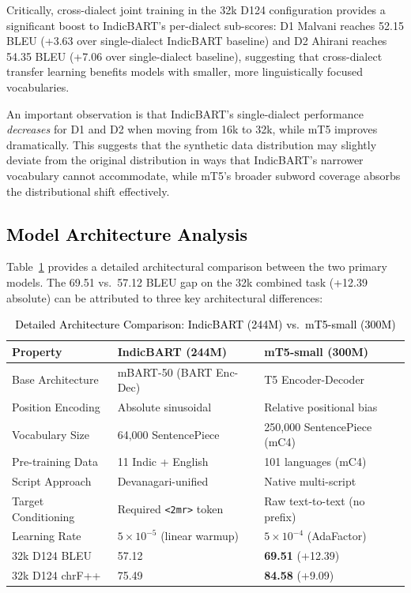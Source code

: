 Critically, cross-dialect joint training in the 32k D124 configuration provides a significant boost to IndicBART's per-dialect sub-scores: D1 Malvani reaches 52.15 BLEU (+3.63 over single-dialect IndicBART baseline) and D2 Ahirani reaches 54.35 BLEU (+7.06 over single-dialect baseline), suggesting that cross-dialect transfer learning benefits models with smaller, more linguistically focused vocabularies.

An important observation is that IndicBART's single-dialect performance \textit{decreases} for D1 and D2 when moving from 16k to 32k, while mT5 improves dramatically. This suggests that the synthetic data distribution may slightly deviate from the original distribution in ways that IndicBART's narrower vocabulary cannot accommodate, while mT5's broader subword coverage absorbs the distributional shift effectively.

\subsection{\textcolor{black}{Model Architecture Analysis}}

Table~\ref{tab:arch_compare} provides a detailed architectural comparison between the two primary models. The 69.51 vs.\ 57.12 BLEU gap on the 32k combined task (+12.39 absolute) can be attributed to three key architectural differences:

\begin{table}[t]
\color{black}
\centering
\caption{\textcolor{black}{Detailed Architecture Comparison: IndicBART (244M) vs.\ mT5-small (300M)}}
\label{tab:arch_compare}
\begin{tabularx}{\textwidth}{lXX}
\hline
\textbf{Property} & \textbf{IndicBART (244M)} & \textbf{mT5-small (300M)} \\
\hline
Base Architecture & mBART-50 (BART Enc-Dec) & T5 Encoder-Decoder \\
Position Encoding & Absolute sinusoidal & Relative positional bias \\
Vocabulary Size & 64,000 SentencePiece & 250,000 SentencePiece (mC4) \\
Pre-training Data & 11 Indic + English & 101 languages (mC4) \\
Script Approach & Devanagari-unified & Native multi-script \\
Target Conditioning & Required \texttt{<2mr>} token & Raw text-to-text (no prefix) \\
Learning Rate & $5 \times 10^{-5}$ (linear warmup) & $5 \times 10^{-4}$ (AdaFactor) \\
32k D124 BLEU & 57.12 & \textbf{69.51} (+12.39) \\
32k D124 chrF++ & 75.49 & \textbf{84.58} (+9.09) \\
\hline
\end{tabularx}
\end{table}

